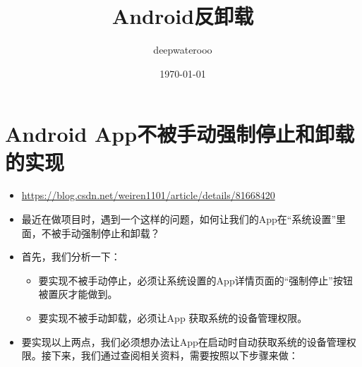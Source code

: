 \documentclass[9pt, b5paper]{article}
\author{deepwaterooo}
\date{\today}
\title{Android反卸载}
\begin{document}
\maketitle
\tableofcontents


\section{Android App不被手动强制停止和卸载的实现}
\label{sec-1}
\begin{itemize}
\item \url{https://blog.csdn.net/weiren1101/article/details/81668420}
\item 最近在做项目时，遇到一个这样的问题，如何让我们的App在“系统设置”里面，不被手动强制停止和卸载？
\item 首先，我们分析一下：
\begin{itemize}
\item 要实现不被手动停止，必须让系统设置的App详情页面的“强制停止”按钮被置灰才能做到。
\item 要实现不被手动卸载，必须让App 获取系统的设备管理权限。
\end{itemize}
\item 要实现以上两点，我们必须想办法让App在启动时自动获取系统的设备管理权限。接下来，我们通过查阅相关资料，需要按照以下步骤来做：
\end{itemize}
\end{document}

